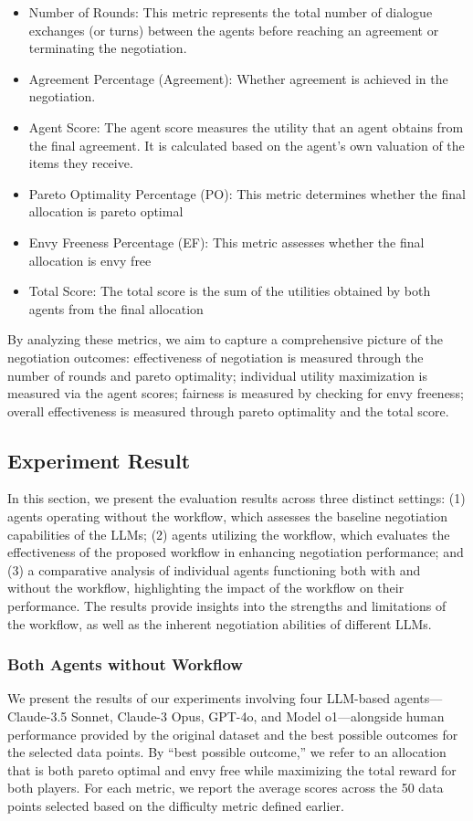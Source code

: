 \begin{itemize}
    \item Number of Rounds: This metric represents the total number of dialogue exchanges (or turns) between the agents before reaching an agreement or terminating the negotiation. 
    \item Agreement Percentage (Agreement): Whether agreement is achieved in the negotiation.
    \item Agent Score: The agent score measures the utility that an agent obtains from the final agreement. It is calculated based on the agent's own valuation of the items they receive.
    \item Pareto Optimality Percentage (PO): This metric determines whether the final allocation is pareto optimal
    \item Envy Freeness Percentage (EF): This metric assesses whether the final allocation is envy free
    \item Total Score: The total score is the sum of the utilities obtained by both agents from the final allocation
\end{itemize}

By analyzing these metrics, we aim to capture a comprehensive picture of the negotiation outcomes: effectiveness of negotiation is measured through the number of rounds and pareto optimality; individual utility maximization is measured via the agent scores; fairness is measured by checking for envy freeness; overall effectiveness is measured through pareto optimality and the total score.

\subsection{Experiment Result}
In this section, we present the evaluation results across three distinct settings: (1) agents operating without the workflow, which assesses the baseline negotiation capabilities of the LLMs; (2) agents utilizing the workflow, which evaluates the effectiveness of the proposed workflow in enhancing negotiation performance; and (3) a comparative analysis of individual agents functioning both with and without the workflow, highlighting the impact of the workflow on their performance. The results provide insights into the strengths and limitations of the workflow, as well as the inherent negotiation abilities of different LLMs.


\subsubsection{Both Agents without Workflow}
We present the results of our experiments involving four LLM-based agents—Claude-3.5 Sonnet, Claude-3 Opus, GPT-4o, and Model o1—alongside human performance provided by the original dataset and the best possible outcomes for the selected data points. By ``best possible outcome,'' we refer to an allocation that is both pareto optimal and envy free while maximizing the total reward for both players. For each metric, we report the average scores across the 50 data points selected based on the difficulty metric defined earlier.

